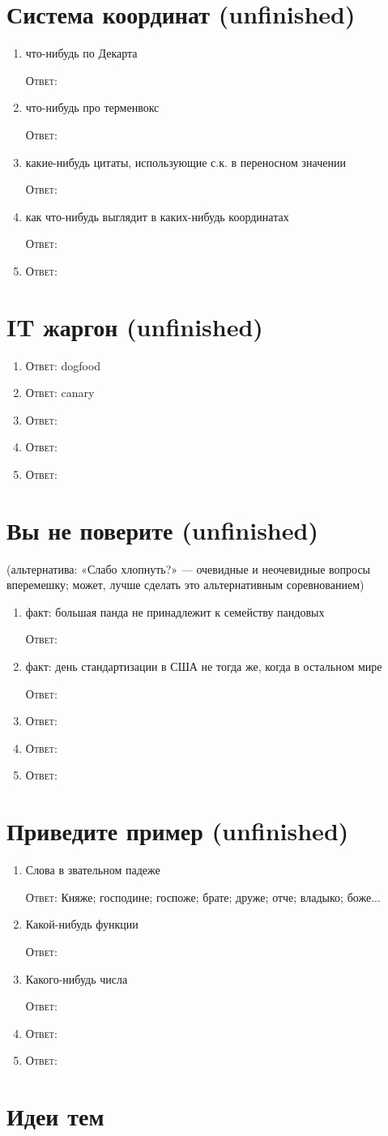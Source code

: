 \documentclass[a4paper,10pt]{article}
\let\keyword\textsc
\newenvironment{topic}{\begin{enumerate}}{\end{enumerate}}
\newcommand{\question}[3]{\item[#1.] #2 \par \keyword{Ответ:} #3}
\begin{document}
\section{Система координат (unfinished)}

\begin{topic}
 \question{??}{что-нибудь по Декарта}{}
 \question{??}{что-нибудь про терменвокс}{}
 \question{??}{какие-нибудь цитаты, использующие с.к. в переносном значении}{}
 \question{??}{как что-нибудь выглядит в каких-нибудь координатах}{}
 \question{??}{}{}
\end{topic}


\section{IT жаргон (unfinished)}

\begin{topic}
 \question{??}{}{dogfood}
 \question{??}{}{canary}
 \question{??}{}{}
 \question{??}{}{}
 \question{??}{}{}
\end{topic}


\section{Вы не поверите (unfinished)}
(альтернатива: «Слабо хлопнуть?» — очевидные и неочевидные вопросы вперемешку; может, лучше сделать это альтернативным соревнованием)

\begin{topic}
 \question{??}{факт: большая панда не принадлежит к семейству пандовых}{}
 \question{??}{факт: день стандартизации в США не тогда же, когда в остальном мире}{}
 \question{??}{}{}
 \question{??}{}{}
 \question{??}{}{}
\end{topic}


\section{Приведите пример (unfinished)}

\begin{topic}
 \question{??}{Слова в звательном падеже}{Княже; господине; госпоже; брате; друже; отче; владыко; боже...}
 \question{??}{Какой-нибудь функции}{}
 \question{??}{Какого-нибудь числа}{}
 \question{??}{}{}
 \question{??}{}{}
\end{topic}


\newpage
\section{Идеи тем}
\end{document}
